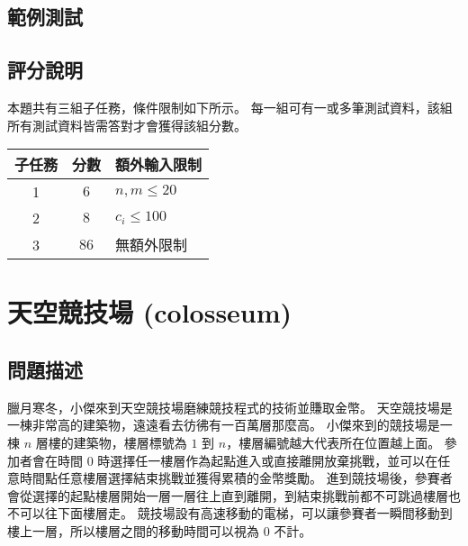 \subsection{範例測試}

\begin{example}
%
%
%
\end{example}

\subsection{評分說明}

本題共有三組子任務，條件限制如下所示。
每一組可有一或多筆測試資料，該組所有測試資料皆需答對才會獲得該組分數。

\begin{longtable}[]{@{}ccl@{}}
\toprule
子任務 & 分數 & 額外輸入限制 \\
\midrule
\endhead
1 & \(6\) & \begin{math}n,m \le 20\end{math} \\
2 & \(8\) & \begin{math}c_i \le 100\end{math} \\
3 & \(86\) & 無額外限制 \\
\bottomrule
\end{longtable}

\section{天空競技場 (colosseum)}

\subsection{問題描述}

臘月寒冬，小傑來到天空競技場磨練競技程式的技術並賺取金幣。
天空競技場是一棟非常高的建築物，遠遠看去彷彿有一百萬層那麼高。
小傑來到的競技場是一棟 \begin{math}n\end{math} 層樓的建築物，樓層標號為
\begin{math}1\end{math} 到
\begin{math}n\end{math}，樓層編號越大代表所在位置越上面。 參加者會在時間
\begin{math}0\end{math}
時選擇任一樓層作為起點進入或直接離開放棄挑戰，並可以在任意時間點任意樓層選擇結束挑戰並獲得累積的金幣獎勵。
進到競技場後，參賽者會從選擇的起點樓層開始一層一層往上直到離開，到結束挑戰前都不可跳過樓層也不可以往下面樓層走。
競技場設有高速移動的電梯，可以讓參賽者一瞬間移動到樓上一層，所以樓層之間的移動時間可以視為
\begin{math}0\end{math} 不計。

